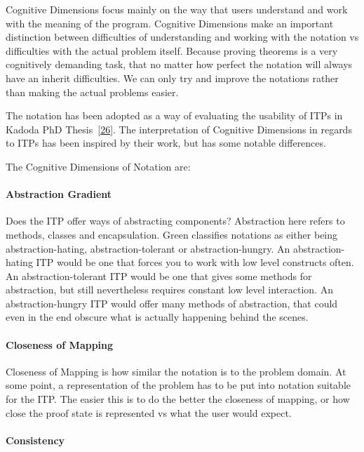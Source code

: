 \documentclass[
]{article}
\begin{document}
Cognitive Dimensions focus mainly on the way that users understand and
work with the meaning of the program. Cognitive Dimensions make an
important distinction between difficulties of understanding and working
with the notation vs difficulties with the actual problem itself.
Because proving theorems is a very cognitively demanding task, that no
matter how perfect the notation will always have an inherit
difficulties. We can only try and improve the notations rather than
making the actual problems easier.

The notation has been adopted as a way of evaluating the usability of
ITPs in Kadoda PhD
Thesis~{[}\protect\hyperlink{ref-kadoda_desirable_1999}{26}{]}. The
interpretation of Cognitive Dimensions in regards to ITPs has been
inspired by their work, but has some notable differences.

The Cognitive Dimensions of Notation are:

\hypertarget{abstraction-gradient}{%
\paragraph{Abstraction Gradient}\label{abstraction-gradient}}

Does the ITP offer ways of abstracting components? Abstraction here
refers to methods, classes and encapsulation. Green classifies notations
as either being abstraction-hating, abstraction-tolerant or
abstraction-hungry. An abstraction-hating ITP would be one that forces
you to work with low level constructs often. An abstraction-tolerant ITP
would be one that gives some methods for abstraction, but still
nevertheless requires constant low level interaction. An
abstraction-hungry ITP would offer many methods of abstraction, that
could even in the end obscure what is actually happening behind the
scenes.

\hypertarget{closeness-of-mapping}{%
\paragraph{Closeness of Mapping}\label{closeness-of-mapping}}

Closeness of Mapping is how similar the notation is to the problem
domain. At some point, a representation of the problem has to be put
into notation suitable for the ITP. The easier this is to do the better
the closeness of mapping, or how close the proof state is represented vs
what the user would expect.

\hypertarget{consistency}{%
\paragraph{Consistency}\label{consistency}}
\end{document}

